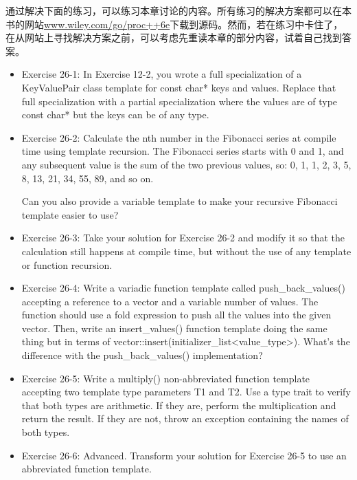 通过解决下面的练习，可以练习本章讨论的内容。所有练习的解决方案都可以在本书的网站\url{www.wiley.com/go/proc++6e}下载到源码。然而，若在练习中卡住了，在从网站上寻找解决方案之前，可以考虑先重读本章的部分内容，试着自己找到答案。

\begin{itemize}
\item
Exercise 26-1: In Exercise 12-2, you wrote a full specialization of a KeyValuePair class template for const char* keys and values. Replace that full specialization with a partial specialization where the values are of type const char* but the keys can be of any type.

\item
Exercise 26-2: Calculate the nth number in the Fibonacci series at compile time using template recursion. The Fibonacci series starts with 0 and 1, and any subsequent value is the sum of the two previous values, so: 0, 1, 1, 2, 3, 5, 8, 13, 21, 34, 55, 89, and so on.

Can you also provide a variable template to make your recursive Fibonacci template easier to use?

\item
Exercise 26-3: Take your solution for Exercise 26-2 and modify it so that the calculation still happens at compile time, but without the use of any template or function recursion.

\item
Exercise 26-4: Write a variadic function template called push\_back\_values() accepting a reference to a vector and a variable number of values. The function should use a fold expression to push all the values into the given vector. Then, write an insert\_values() function template doing the same thing but in terms of vector::insert(initializer\_list<value\_type>). What’s the difference with the push\_back\_values() implementation?

\item
Exercise 26-5: Write a multiply() non-abbreviated function template accepting two template type parameters T1 and T2. Use a type trait to verify that both types are arithmetic. If they are, perform the multiplication and return the result. If they are not, throw an exception containing the names of both types.

\item
Exercise 26-6: Advanced. Transform your solution for Exercise 26-5 to use an abbreviated function template.
\end{itemize}




















